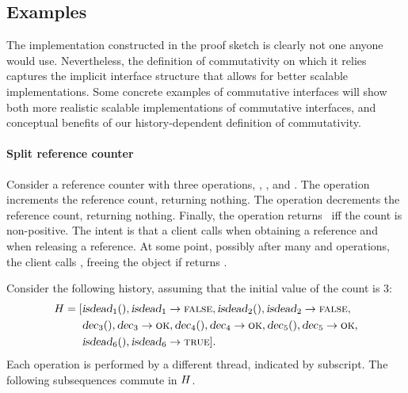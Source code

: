 \subsection{Examples}

The implementation constructed in the proof sketch is clearly not one
anyone would use.
%
Nevertheless, the definition of commutativity on which it relies
captures the implicit interface structure that allows for better
scalable implementations.
%
Some concrete examples of commutative interfaces will show both more
realistic scalable implementations of commutative interfaces, and
conceptual benefits of our history-dependent definition of
commutativity.


\paragraph{Split reference counter}

Consider a reference counter with three operations, , ,
and .
%
The  operation increments the reference count, returning
nothing.
%
The  operation decrements the reference count, returning
nothing.
%
Finally, the  operation returns \TRUE\ iff the count is
non-positive.
%
The intent is that a client calls  when obtaining a reference
and  when releasing a reference.  At some point, possibly after
many  and  operations, the client
calls , freeing the object if  returns \TRUE.

Consider the following history, assuming that the initial value of the
count is 3:
%
\begin{align*}
H = [& \text{\textsl{isdead}}_{1}(), \text{\textsl{isdead}}_{1} \rightarrow \textsc{false},
	\text{\textsl{isdead}}_{2}(), \text{\textsl{isdead}}_{2} \rightarrow \textsc{false}, \\
	&\text{\textsl{dec}}_{3}(), \text{\textsl{dec}}_{3} \rightarrow \textsc{ok},
	\text{\textsl{dec}}_{4}(), \text{\textsl{dec}}_{4} \rightarrow \textsc{ok},
	\text{\textsl{dec}}_{5}(), \text{\textsl{dec}}_{5} \rightarrow \textsc{ok}, \\
        &\text{\textsl{isdead}}_{6}(), \text{\textsl{isdead}}_{6} \rightarrow \textsc{true}].
\end{align*}
%
Each operation is
performed by a different thread, indicated by subscript.
%
The following subsequences commute in $H$.

